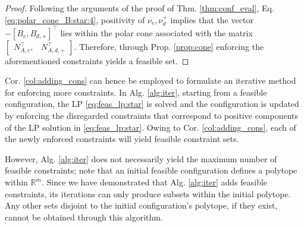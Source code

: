 \documentclass[letterpaper, 10 pt, conference]{ieeeconf}  %
\begin{document}
\begin{proof}
    Following the arguments of the proof of Thm. \ref{thm:conf_eval}, Eq. \eqref{eq:polar_cone_B:star:4}, positivity of $\nu_e, \nu_d^+$ implies that the vector $-\left[  B_{e}, B_{d,+}  \right]^\top$ lies within the polar cone associated with the matrix $ \begin{bmatrix}
             N_{A,e}^\top, & 
             N_{A,d,+}^\top 
         \end{bmatrix}$. Therefore, through Prop. \ref{prop:cone} enforcing the aforementioned constraints yields a feasible set.   
\end{proof}
Cor. \ref{col:adding_cons} can hence be employed to formulate an iterative method for enforcing more constraints. In Alg. \ref{alg:iter}, starting from a feasible configuration, the LP \eqref{eq:feas_lp:star} is solved and the configuration is updated by enforcing the disregarded constraints that correspond to positive components of the LP solution in \eqref{eq:feas_lp:star}. Owing to Cor. \ref{col:adding_cons}, each of the newly enforced constraints will yield feasible constraint sets.  
\par 
However, Alg. \ref{alg:iter} does not necessarily yield the maximum number of feasible constraints; note that an initial feasible configuration defines a polytope within $\mathbb{R}^m$. Since we have demonstrated that Alg. \ref{alg:iter} adds feasible constraints, its iterations can  only produce subsets within the initial polytope. Any other sets disjoint to the initial configuration's polytope, {\color{red}if they exist,} cannot be obtained through this algorithm. 
\end{document}
